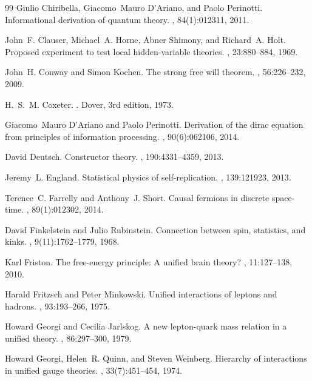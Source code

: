 \begin{thebibliography}{99}
Giulio Chiribella, Giacomo~Mauro D'Ariano, and Paolo Perinotti.
\newblock Informational derivation of quantum theory.
, 84(1):012311, 2011.

John~F. Clauser, Michael~A. Horne, Abner Shimony, and Richard~A. Holt.
\newblock Proposed experiment to test local hidden-variable theories.
, 23:880--884, 1969.

John~H. Conway and Simon Kochen.
\newblock The strong free will theorem.
, 56:226--232, 2009.

H.~S.~M. Coxeter.
.
\newblock Dover, 3rd edition, 1973.

Giacomo~Mauro D'Ariano and Paolo Perinotti.
\newblock Derivation of the dirac equation from principles of information
  processing.
, 90(6):062106, 2014.

David Deutsch.
\newblock Constructor theory.
, 190:4331--4359, 2013.

Jeremy~L. England.
\newblock Statistical physics of self-replication.
, 139:121923, 2013.

Terence~C. Farrelly and Anthony~J. Short.
\newblock Causal fermions in discrete space-time.
, 89(1):012302, 2014.

David Finkelstein and Julio Rubinstein.
\newblock Connection between spin, statistics, and kinks.
, 9(11):1762--1779, 1968.

Karl Friston.
\newblock The free-energy principle: A unified brain theory?
, 11:127--138, 2010.

Harald Fritzsch and Peter Minkowski.
\newblock Unified interactions of leptons and hadrons.
, 93:193--266, 1975.

Howard Georgi and Cecilia Jarlskog.
\newblock A new lepton-quark mass relation in a unified theory.
, 86:297--300, 1979.

Howard Georgi, Helen~R. Quinn, and Steven Weinberg.
\newblock Hierarchy of interactions in unified gauge theories.
, 33(7):451--454, 1974.


\end{thebibliography}
